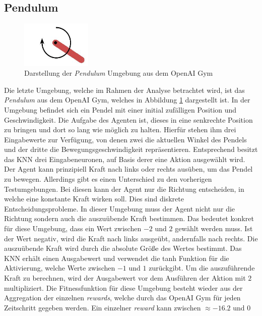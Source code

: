 \subsection{Pendulum}
\begin{figure}[!h]
	\centering
	\includegraphics[width=0.3\textwidth]{./img/pendulum_env.JPG} 
	\caption{Darstellung der \emph{Pendulum} Umgebung aus dem OpenAI Gym}
	\label{fig:pendulum_env}
\end{figure}
\noindent
Die letzte Umgebung, welche im Rahmen der Analyse betrachtet wird, ist das \emph{Pendulum} aus dem OpenAI Gym, welches in Abbildung \ref{fig:pendulum_env} dargestellt ist. In der Umgebung befindet sich ein Pendel mit einer initial zufälligen Position und Geschwindigkeit. Die Aufgabe des Agenten ist, dieses in eine senkrechte Position zu bringen und dort so lang wie möglich zu halten. Hierfür stehen ihm drei Eingabewerte zur Verfügung, von denen zwei die aktuellen Winkel des Pendels und der dritte die Bewegungsgeschwindigkeit repräsentieren. Entsprechend besitzt das \ac{KNN} drei Eingabeneuronen, auf Basis derer eine Aktion ausgewählt wird. Der Agent kann prinzipiell Kraft nach links oder rechts ausüben, um das Pendel zu bewegen. Allerdings gibt es einen Unterschied zu den vorherigen Testumgebungen. Bei diesen kann der Agent nur die Richtung entscheiden, in welche eine konstante Kraft wirken soll. Dies sind diskrete Entscheidungsprobleme. In dieser Umgebung muss der Agent nicht nur die Richtung sondern auch die auszuübende Kraft bestimmen. Das bedeutet konkret für diese Umgebung, dass ein Wert zwischen $-2$ und $2$ gewählt werden muss. Ist der Wert negativ, wird die Kraft nach links ausgeübt, andernfalls nach rechts. Die auszuübende Kraft wird durch die absolute Größe des Wertes bestimmt. Das \ac{KNN} erhält einen Ausgabewert und verwendet die \ac{tanh} Funktion für die Aktivierung, welche Werte zwischen $-1$ und $1$ zurückgibt. Um die auszuführende Kraft zu berechnen, wird der Ausgabewert vor dem Ausführen der Aktion mit $2$ multipliziert. Die Fitnessfunktion für diese Umgebung besteht wieder aus der Aggregation der einzelnen \emph{rewards}, welche durch das OpenAI Gym für jeden Zeitschritt gegeben werden. Ein einzelner \emph{reward} kann zwischen $\approx -16.2$ und $0$ 